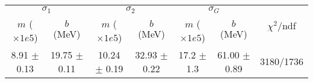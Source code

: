 \begin{tabular}{cc|cc|cc||c}
\multicolumn{2}{c|}{$\sigma_1$} & \multicolumn{2}{|c}{$\sigma_2$} & \multicolumn{2}{|c}{$\sigma_G$}  & \multirow{2}{*}{$\chi^2/$ndf}\\
$m$ ($\times1e5$) & $b$ (MeV) & $m$ ($\times1e5$) & $b$ (MeV) & $m$ ($\times1e5$) & $b$ (MeV) & \\
\hline
8.91 $\pm$ 0.13 & 19.75 $\pm$ 0.11 & 10.24 $\pm$ 0.19 & 32.93 $\pm$ 0.22 & 17.2 $\pm$ 1.3 & 61.00 $\pm$ 0.89 & 3180/1736\\
\end{tabular}
